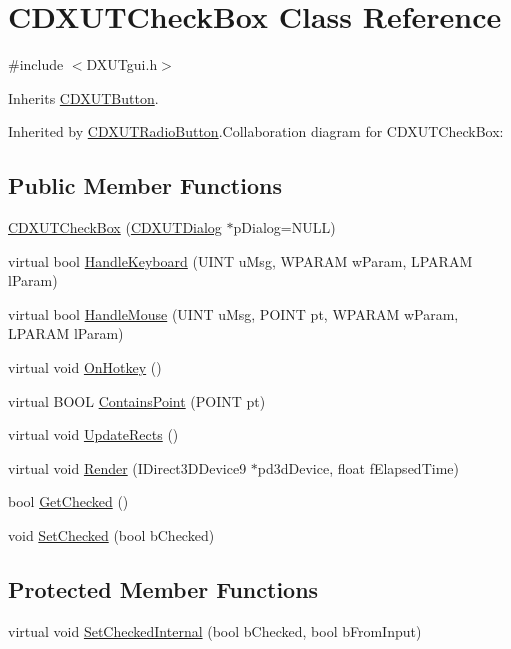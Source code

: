 \hypertarget{class_c_d_x_u_t_check_box}{
\section{CDXUTCheckBox Class Reference}
\label{class_c_d_x_u_t_check_box}
}


{\ttfamily \#include $<$DXUTgui.h$>$}

Inherits \hyperlink{class_c_d_x_u_t_button}{CDXUTButton}.

Inherited by \hyperlink{class_c_d_x_u_t_radio_button}{CDXUTRadioButton}.Collaboration diagram for CDXUTCheckBox:\subsection*{Public Member Functions}
\begin{DoxyCompactItemize}
\item 
\hyperlink{class_c_d_x_u_t_check_box_a68cb9ebbafe610be02ad6b8ca72ca5d7}{CDXUTCheckBox} (\hyperlink{class_c_d_x_u_t_dialog}{CDXUTDialog} $\ast$pDialog=NULL)
\item 
virtual bool \hyperlink{class_c_d_x_u_t_check_box_a6e37b9b6be8e2c13df2927c1cf3d63ef}{HandleKeyboard} (UINT uMsg, WPARAM wParam, LPARAM lParam)
\item 
virtual bool \hyperlink{class_c_d_x_u_t_check_box_a4638ad4bb74d1a5fae3ba2b8b01072d6}{HandleMouse} (UINT uMsg, POINT pt, WPARAM wParam, LPARAM lParam)
\item 
virtual void \hyperlink{class_c_d_x_u_t_check_box_a5d9a74ce30be05f4867945c80f298a0a}{OnHotkey} ()
\item 
virtual BOOL \hyperlink{class_c_d_x_u_t_check_box_af0a106a73957da96d23dd53c2b9da8e8}{ContainsPoint} (POINT pt)
\item 
virtual void \hyperlink{class_c_d_x_u_t_check_box_a3b60479864ee9a21c14f92ff5373fc14}{UpdateRects} ()
\item 
virtual void \hyperlink{class_c_d_x_u_t_check_box_a518c5e4d5250b1c0be83bf456c43f8b8}{Render} (IDirect3DDevice9 $\ast$pd3dDevice, float fElapsedTime)
\item 
bool \hyperlink{class_c_d_x_u_t_check_box_a17449ea0718aa35b988bb6d079e36a58}{GetChecked} ()
\item 
void \hyperlink{class_c_d_x_u_t_check_box_ac6fa565a1c5740f2a908746b977689a2}{SetChecked} (bool bChecked)
\end{DoxyCompactItemize}
\subsection*{Protected Member Functions}
\begin{DoxyCompactItemize}
\item 
virtual void \hyperlink{class_c_d_x_u_t_check_box_a022d282182fef2c403b7f57ba3c81019}{SetCheckedInternal} (bool bChecked, bool bFromInput)
\end{DoxyCompactItemize}
